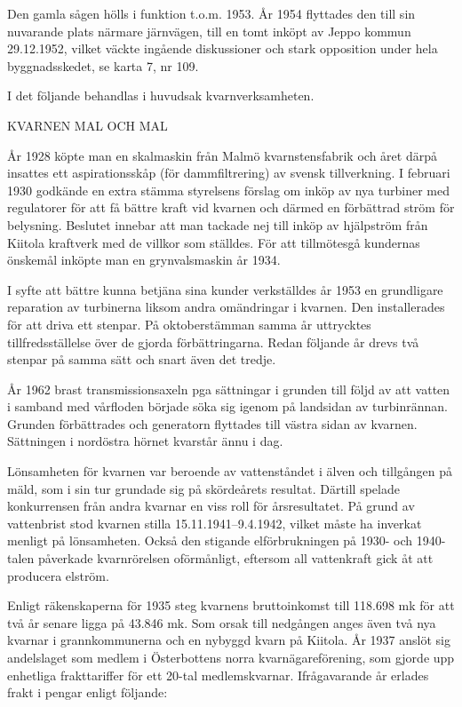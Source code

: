 Den gamla sågen hölls i funktion t.o.m. 1953. År 1954 flyttades den till sin nuvarande plats närmare järnvägen, till en tomt inköpt av Jeppo kommun 29.12.1952, vilket väckte ingående diskussioner och stark opposition under hela byggnadsskedet, se karta 7, nr 109.

I det följande behandlas i huvudsak kvarnverksamheten.





KVARNEN MAL OCH MAL

År 1928 köpte man en skalmaskin från Malmö kvarnstensfabrik och året därpå insattes ett aspirationsskåp (för dammfiltrering) av svensk tillverkning. I februari 1930 godkände en extra stämma styrelsens förslag om inköp av nya turbiner med regulatorer för att få bättre kraft vid kvarnen och därmed en förbättrad ström för belysning. Beslutet innebar att man tackade nej till inköp av hjälpström från Kiitola kraftverk med de villkor som ställdes. För att tillmötesgå kundernas önskemål inköpte man en grynvalsmaskin år 1934.

I syfte att bättre kunna betjäna sina kunder verkställdes år 1953 en grundligare reparation av turbinerna liksom andra omändringar i kvarnen. Den  installerades för att driva ett stenpar. På oktoberstämman samma år uttrycktes tillfredsställelse över de gjorda förbättringarna. Redan följande år drevs två stenpar på samma sätt och snart även det tredje.

År 1962 brast transmissionsaxeln pga sättningar i grunden till följd av att vatten i samband med vårfloden började söka sig igenom på landsidan av turbinrännan. Grunden förbättrades och generatorn flyttades till västra sidan av kvarnen. Sättningen i nordöstra hörnet kvarstår ännu i dag.

Lönsamheten för kvarnen var beroende av vattenståndet i älven och tillgången på mäld, som i sin tur grundade sig på skördeårets resultat. Därtill spelade konkurrensen från andra kvarnar en viss roll för årsresultatet. På grund av vattenbrist stod kvarnen stilla 15.11.1941--9.4.1942, vilket måste ha inverkat menligt på lönsamheten. Också den stigande elförbrukningen på 1930- och 1940-talen påverkade kvarnrörelsen oförmånligt, eftersom all vattenkraft gick åt att producera elström.

Enligt räkenskaperna för 1935 steg kvarnens bruttoinkomst till 118.698 mk för att två år senare ligga på 43.846 mk. Som orsak till nedgången anges även två nya kvarnar i grannkommunerna och en nybyggd kvarn på Kiitola. År 1937 anslöt sig andelslaget som medlem i Österbottens norra kvarnägareförening, som gjorde upp enhetliga frakttariffer för ett 20-tal medlemskvarnar. Ifrågavarande år erlades frakt i pengar enligt följande:

